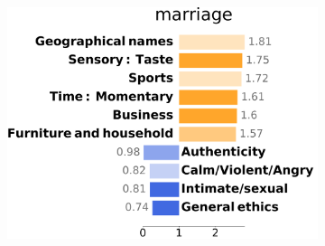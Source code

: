 \documentclass[letterpaper]{article} %
\begin{document}
\begin{figure}[!htb]
\begin{subfigure}[b]{\textwidth}
    \includegraphics[scale=0.13]{figs/marriage.pdf}


\end{subfigure}
\end{figure}
\end{document}
